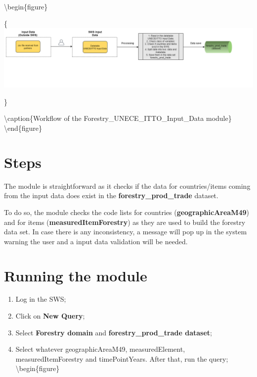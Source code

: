 \documentclass[
]{book}
\begin{document}
\textbackslash begin\{figure\}

\{\centering \includegraphics[width=1\linewidth]{images/forestryInputDataUNECE}

\}

\textbackslash caption\{Workflow of the Forestry\_UNECE\_ITTO\_Input\_Data module\}\label{fig:forestryInputData}
\textbackslash end\{figure\}

\hypertarget{steps}{%
\section{\texorpdfstring{\textbf{Steps}}{Steps}}\label{steps}}

The module is straightforward as it checks if the data for countries/items coming from the input data does exist in the \textbf{forestry\_prod\_trade} dataset.

To do so, the module checks the code lists for countries (\textbf{geographicAreaM49}) and for items (\textbf{measuredItemForestry}) as they are used to build the forestry data set. In case there is any inconsistency, a message will pop up in the system warning the user and a input data validation will be needed.

\hypertarget{running-the-module}{%
\section{\texorpdfstring{\textbf{Running the module}}{Running the module}}\label{running-the-module}}

\begin{enumerate}
\def\labelenumi{\arabic{enumi}.}
\item
  Log in the SWS;
\item
  Click on \textbf{New Query};
\item
  Select \textbf{Forestry domain} and \textbf{forestry\_prod\_trade dataset};
\item
  Select whatever geographicAreaM49, measuredElement, measuredItemForestry and timePointYears. After that, run the query;
  \textbackslash begin\{figure\}
\end{enumerate}
\end{document}
